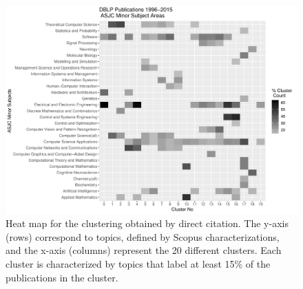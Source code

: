\begin{figure}[ht]
\centering
\includegraphics[scale=0.6]{scopus_dblp_graclus3.pdf}
\caption{Heat map for the clustering obtained by direct citation. The  y-axis (rows) correspond to topics, defined by Scopus characterizations, and the
x-axis (columns) represent the 20 different clusters.  
Each cluster is characterized by topics that label at least 15\% of the publications in the cluster.
 }
\label{fig:heatmap}       %
\end{figure}

\newpage

